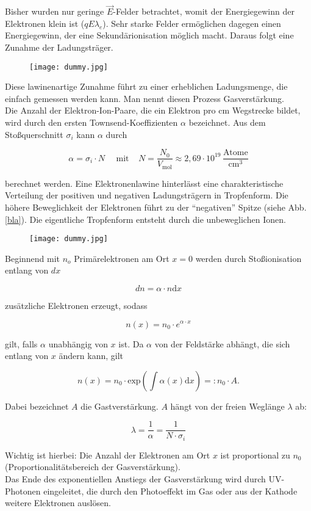 Bisher wurden nur geringe $\vec{E}$-Felder betrachtet, womit der Energiegewinn der Elektronen klein
ist ($qE\lambda_e$). Sehr starke Felder ermöglichen dagegen einen Energiegewinn, der eine
Sekundärionisation möglich macht. Daraus folgt eine Zunahme der Ladungsträger.

\begin{figure}[H]
	\centering
	\texttt{[image: dummy.jpg]}
\end{figure}

Diese lawinenartige Zunahme führt zu einer erheblichen Ladungsmenge, die einfach gemessen werden
kann. Man nennt diesen Prozess Gasverstärkung.
\\
Die Anzahl der Elektron-Ion-Paare, die ein Elektron pro cm Wegstrecke bildet, wird durch den ersten
Townsend-Koeffizienten $\alpha$ bezeichnet. Aus dem Stoßquerschnitt $\sigma_i$ kann $\alpha$ durch 

\[\alpha = \sigma_i\cdot N~~~~~~\text{mit}~~~~~ N=\frac{N_0}{V_{\text{mol}}}\approx
2{,}69\cdot10^{19}\,\frac{\text{Atome}}{\text{cm}^3} \]

berechnet werden. Eine Elektronenlawine hinterlässt eine charakteristische Verteilung der positiven
und negativen Ladungsträgern in Tropfenform. Die höhere Beweglichkeit der Elektronen führt zu der
"`negativen"' Spitze (siehe Abb. \ref{bla}). Die eigentliche Tropfenform entsteht durch die
unbeweglichen Ionen.

\begin{figure}[H]
	\centering
	\texttt{[image: dummy.jpg]}
\end{figure}

Beginnend mit $n_o$ Primärelektronen am Ort $x=0$ werden durch Stoßionisation entlang von $dx$

\[ dn = \alpha\cdot n \mathrm{d}x  \]

zusätzliche Elektronen erzeugt, sodass

\[n(x)=n_0\cdot e^{\alpha\cdot x}   \]

gilt, falls $\alpha$ unabhängig von $x$ ist. Da $\alpha$ von der Feldstärke abhängt, die sich
entlang von $x$ ändern kann, gilt

\[n(x)=n_0\cdot \text{exp}\left(\int\alpha(x)\mathrm{d}x \right)=:n_0\cdot A  .\]

Dabei bezeichnet $A$ die Gastverstärkung. $A$ hängt von der freien Weglänge $\lambda$ ab:

\[\lambda =\frac{1}{\alpha}=\frac{1}{N\cdot\sigma_i}  \]

Wichtig ist hierbei: Die Anzahl der Elektronen am Ort $x$ ist proportional zu $n_0$
(Proportionalitätsbereich der Gasverstärkung).
\\
Das Ende des exponentiellen Anstiegs der Gasverstärkung wird durch UV-Photonen eingeleitet, die
durch den Photoeffekt im Gas oder aus der Kathode weitere Elektronen auslösen.

